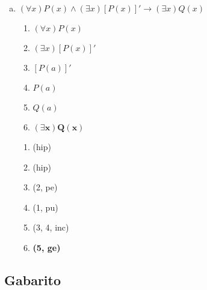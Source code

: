 \documentclass[a4paper, 12pt, addpoints]{exam}
\begin{document}
\begin{questions}
\begin{resp}
\begin{enumerate}[a)]
\begin{multicols}{2}
            \end{multicols}

      \item $(\forall x)P(x) \land (\exists x)[P(x)]' \rightarrow (\exists x)Q(x)$
            \begin{multicols}{2}

              \begin{enumerate}[1.]
                \item $(\forall x)P(x)$
                \item $(\exists x)[P(x)]'$
                \item $[P(a)]'$
                \item $P(a)$
                \item $Q(a)$
                \item $\boldsymbol{(\exists x)Q(x)}$
              \end{enumerate}

              \columnbreak

              \begin{enumerate}[\ding{32}]
                \item (hip)
                \item (hip)
                \item (2, pe)
                \item (1, pu)
                \item (3, 4, inc)
                \item \textbf{(5, ge)}
              \end{enumerate}

            \end{multicols}
    \end{enumerate}
  \end{resp}

\end{questions}

\newpage

\vspace{1cm}
\begin{center}
  \section*{Gabarito}
\end{center}
\end{document}
